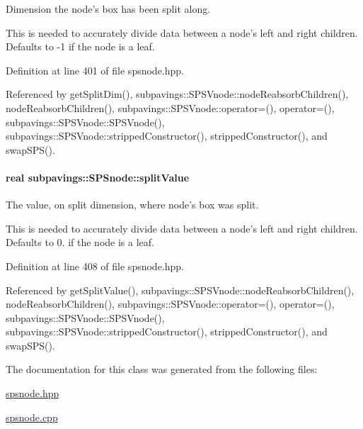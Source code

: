 \-Dimension the node's box has been split along. 

\-This is needed to accurately divide data between a node's left and right children. \-Defaults to -\/1 if the node is a leaf. 

\-Definition at line 401 of file spsnode.\-hpp.



\-Referenced by get\-Split\-Dim(), subpavings\-::\-S\-P\-S\-Vnode\-::node\-Reabsorb\-Children(), node\-Reabsorb\-Children(), subpavings\-::\-S\-P\-S\-Vnode\-::operator=(), operator=(), subpavings\-::\-S\-P\-S\-Vnode\-::\-S\-P\-S\-Vnode(), subpavings\-::\-S\-P\-S\-Vnode\-::stripped\-Constructor(), stripped\-Constructor(), and swap\-S\-P\-S().

\hypertarget{classsubpavings_1_1SPSnode_a60ef987525bfd22dd0a5adadc141f0b6}{
\paragraph[{split\-Value}]{\setlength{\rightskip}{0pt plus 5cm}real {\bf subpavings\-::\-S\-P\-Snode\-::split\-Value}}}\label{classsubpavings_1_1SPSnode_a60ef987525bfd22dd0a5adadc141f0b6}


\-The value, on split dimension, where node's box was split. 

\-This is needed to accurately divide data between a node's left and right children. \-Defaults to 0. if the node is a leaf. 

\-Definition at line 408 of file spsnode.\-hpp.



\-Referenced by get\-Split\-Value(), subpavings\-::\-S\-P\-S\-Vnode\-::node\-Reabsorb\-Children(), node\-Reabsorb\-Children(), subpavings\-::\-S\-P\-S\-Vnode\-::operator=(), operator=(), subpavings\-::\-S\-P\-S\-Vnode\-::\-S\-P\-S\-Vnode(), subpavings\-::\-S\-P\-S\-Vnode\-::stripped\-Constructor(), stripped\-Constructor(), and swap\-S\-P\-S().



\-The documentation for this class was generated from the following files\-:\begin{DoxyCompactItemize}
\item 
\hyperlink{spsnode_8hpp}{spsnode.\-hpp}\item 
\hyperlink{spsnode_8cpp}{spsnode.\-cpp}\end{DoxyCompactItemize}
